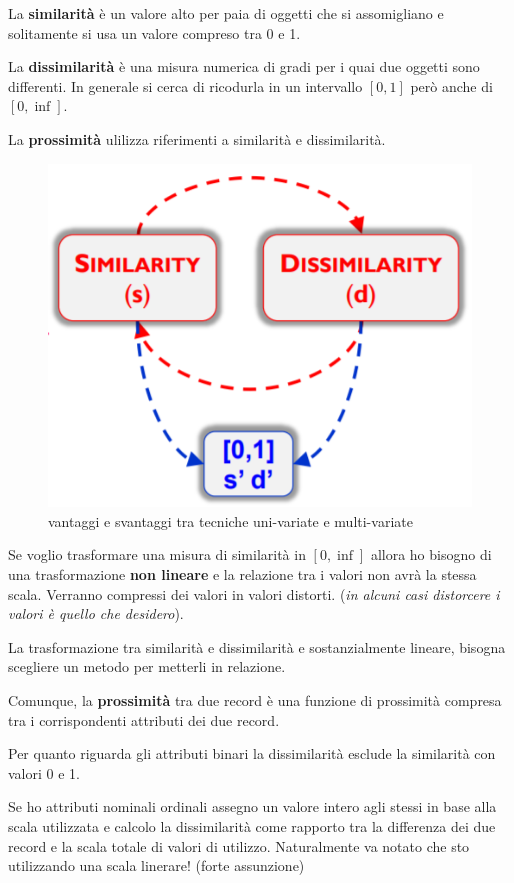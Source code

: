 La \textbf{similarit\`a} \`e un valore alto per paia di oggetti che si assomigliano e solitamente si usa un valore compreso tra 0 e 1. 

La \textbf{dissimilarit\`a} \`e una misura numerica di gradi per i quai due oggetti sono differenti. In generale si cerca di ricodurla in un intervallo $[0,1]$ per\`o anche di $[0,\inf]$.

La \textbf{prossimit\`a} ulilizza riferimenti a similarit\`a e dissimilarit\`a.

\begin{figure}[h!]
	\centering
	\includegraphics[height=0.45 \linewidth]{clustering/pict/simil_diss.png}
	\caption{vantaggi e svantaggi tra tecniche uni-variate e multi-variate}
\end{figure}

Se voglio trasformare una misura di similarit\`a in $[0,\inf]$ allora ho bisogno di una trasformazione \textbf{non lineare} e la relazione tra i valori non avr\`a la stessa scala. Verranno compressi dei valori in valori distorti. (\textit{in alcuni casi distorcere i valori \`e quello che desidero}). 

La trasformazione tra similarit\`a e dissimilarit\`a e sostanzialmente lineare, bisogna scegliere un metodo per metterli in relazione. 

Comunque, la \textbf{prossimit\`a} tra due record \`e una funzione di prossimit\`a compresa tra i corrispondenti attributi dei due record.

Per quanto riguarda gli attributi binari la dissimilarit\`a esclude la similarit\`a con valori 0 e 1. 

Se ho attributi nominali ordinali assegno un valore intero agli stessi in base alla scala utilizzata e calcolo la dissimilarit\`a come rapporto tra la differenza dei due record e la scala totale di valori di utilizzo. Naturalmente va notato che sto utilizzando una scala linerare! (forte assunzione)

